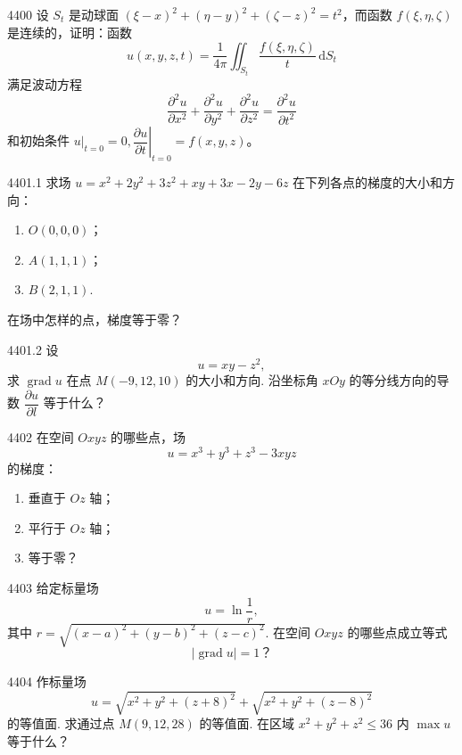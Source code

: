 \begin{prob}[L]{4400}
设 $S_{t}$ 是动球面 $(\xi-x)^{2}+(\eta-y)^{2}+(\zeta-z)^{2}=t^{2}$，而函数 $f(\xi, \eta, \zeta)$ 是连续的，证明：函数
\[u(x,y,z,t) = \frac{1}{4\pi} \iint_{S_{t}} \frac{f(\xi, \eta, \zeta)}{t}\,\mathrm{d}S_{t}\]
满足波动方程
\[\frac{\partial^{2} u}{\partial x^{2}} + \frac{\partial^{2} u}{\partial y^{2}} + \frac{\partial^{2} u}{\partial z^{2}} = \frac{\partial^{2} u}{\partial t^{2}}\]
和初始条件 $\left. u \right|_{t=0} = 0, \left. \dfrac{\partial u}{\partial t} \right|_{t=0} = f(x,y,z)$。
\end{prob}


\begin{prob}[L]{4401.1}
求场 $u = x^2 + 2y^2 + 3z^2 + xy + 3x - 2y - 6z$ 在下列各点的梯度的大小和方向：
\begin{enumerate}[label=(\alph*), itemsep=2pt, topsep=3pt]
  \item $O(0, 0, 0)$；
  \item $A(1, 1, 1)$；
  \item $B(2, 1, 1)$.
\end{enumerate}
在场中怎样的点，梯度等于零？
\end{prob}

\begin{prob}[M]{4401.2}
设
\[
u = xy - z^2,
\]
求 $\operatorname{grad} u$ 在点 $M(-9, 12, 10)$ 的大小和方向. 沿坐标角 $xOy$ 的等分线方向的导数 $\dfrac{\partial u}{\partial l}$ 等于什么？
\end{prob}

\begin{prob}[L]{4402}
在空间 $Oxyz$ 的哪些点，场
\[
u = x^3 + y^3 + z^3 - 3xyz
\]
的梯度：
\begin{enumerate}[label=(\alph*), itemsep=2pt, topsep=3pt]
  \item 垂直于 $Oz$ 轴；
  \item 平行于 $Oz$ 轴；
  \item 等于零？
\end{enumerate}
\end{prob}

\begin{prob}[M]{4403}
给定标量场
\[
u = \ln \frac{1}{r},
\]
其中 $r = \sqrt{(x - a)^2 + (y - b)^2 + (z - c)^2}$. 在空间 $Oxyz$ 的哪些点成立等式
\[
|\operatorname{grad} u| = 1\text{？}
\]
\end{prob}

\begin{prob}[M]{4404}
作标量场
\[
u = \sqrt{x^2 + y^2 + (z + 8)^2} + \sqrt{x^2 + y^2 + (z - 8)^2}
\]
的等值面. 求通过点 $M(9, 12, 28)$ 的等值面. 在区域 $x^2 + y^2 + z^2 \leqslant 36$ 内 $\max u$ 等于什么？
\end{prob}

